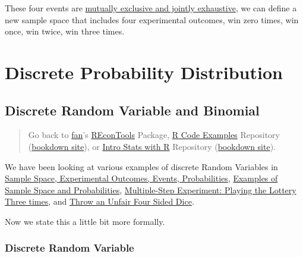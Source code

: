 \documentclass[
]{book}
\begin{document}
These four events are \href{https://fanwangecon.github.io/Stat4Econ/probability/htmlpdfr/samplespace.html}{mutually exclusive and jointly exhaustive}, we can define a new sample space that includes four experimental outcomes, win zero times, win once, win twice, win three times.

\hypertarget{discrete-probability-distribution}{%
\chapter{Discrete Probability Distribution}\label{discrete-probability-distribution}}

\hypertarget{discrete-random-variable-and-binomial}{%
\section{Discrete Random Variable and Binomial}\label{discrete-random-variable-and-binomial}}

\begin{quote}
Go back to \href{http://fanwangecon.github.io/}{fan}'s \href{https://fanwangecon.github.io/REconTools/}{REconTools} Package, \href{https://fanwangecon.github.io/R4Econ/}{R Code Examples} Repository (\href{https://fanwangecon.github.io/R4Econ/bookdown}{bookdown site}), or \href{https://fanwangecon.github.io/Stat4Econ/}{Intro Stats with R} Repository (\href{https://fanwangecon.github.io/Stat4Econ/bookdown}{bookdown site}).
\end{quote}

We have been looking at various examples of discrete Random Variables in \href{https://fanwangecon.github.io/Stat4Econ/probability/htmlpdfr/samplespace.html}{Sample Space, Experimental Outcomes, Events, Probabilities}, \href{https://fanwangecon.github.io/Stat4Econ/probability/htmlpdfr/samplespaceexa.html}{Examples of Sample Space and Probabilities}, \href{https://fanwangecon.github.io/Stat4Econ/probability/htmlpdfr/lottery.html}{Multiple-Step Experiment: Playing the Lottery Three times}, and \href{https://fanwangecon.github.io/Stat4Econ/probability/htmlpdfr/samplespacedice.html}{Throw an Unfair Four Sided Dice}.

Now we state this a little bit more formally.

\hypertarget{discrete-random-variable}{%
\subsection{Discrete Random Variable}\label{discrete-random-variable}}
\end{document}
